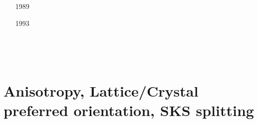 \begin{scriptsize}
\begin{itemize}
\item[1989]
\textcite{brbe89b} 
\item[1993]
\textcite{gowo93} 
\item[\twothousandthree]
\textcite{hube03} 
\item[\twothousandsix]
\textcite{coma06} 
\item[\twothousandeight]
\textcite{vanv08} \\ 
\textcite{naht08} 
\item[\twothousandeleven]
\textcite{vanj11} 
\item[\twothousandfourteen]
\textcite{buge14}  \\
\textcite{flgw14} 
\item[\twothousandfifteen]
\textcite{svlh15} 
\item[\twothousandsixteen]
\textcite{frsc16} 
\end{itemize}
\end{scriptsize}


\section{Anisotropy, Lattice/Crystal preferred orientation, SKS splitting}
\label{sec:topics:anisotropy}

